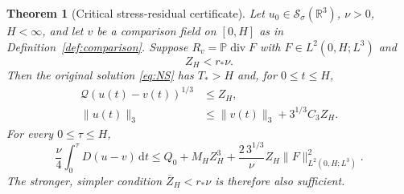 \documentclass[11pt,a4paper]{article}
\newtheorem{theorem}{Theorem}[section]
\theoremstyle{definition}\newtheorem{definition}[theorem]{Definition}
\theoremstyle{remark}\newtheorem{remark}[theorem]{Remark}
\newcommand{\R}{\mathbb R}
\newcommand{\Q}{\mathcal Q}
\newcommand{\PP}{\mathbb P}
\newcommand{\dd}{\,\mathrm d}
\newcommand{\norm}[1]{\lVert #1\rVert}
\newcommand{\diver}{\operatorname{div}}
\newcommand{\Sch}{\mathcal S_\sigma(\R^3)}
\newcommand{\rstar}{r_*}
\numberwithin{equation}{section}
\begin{document}
\begin{theorem}[Critical stress-residual certificate]\label{thm:certificate}
Let $u_0\in\Sch$, $\nu>0$, $H<\infty$, and let $v$ be a comparison field on $[0,H]$ as in Definition~\ref{def:comparison}. Suppose $R_v=\PP\diver F$ with $F\in L^2(0,H;L^3)$ and
\begin{equation}\label{eq:certsmall}
 Z_H<\rstar\nu.
\end{equation}
Then the original solution \eqref{eq:NS} has $T_*>H$ and, for $0\le t\le H$,
\begin{align}
 \Q(u(t)-v(t))^{1/3}&\le Z_H,\label{eq:errbound}\\
 \norm{u(t)}_3&\le\norm{v(t)}_3+3^{1/3}C_3Z_H.\label{eq:ubound}
\end{align}
For every $0\le\tau\le H$,
\begin{equation}\label{eq:Dbound}
 \frac\nu4\int_0^\tau D(u-v)\dd t
 \le Q_0+M_H Z_H^3+\frac{2\,3^{1/3}}\nu
      Z_H\norm F_{L^2(0,H;L^3)}^2.
\end{equation}
The stronger, simpler condition $\overline Z_H<\rstar\nu$ is therefore also sufficient.
\end{theorem}
\end{document}
